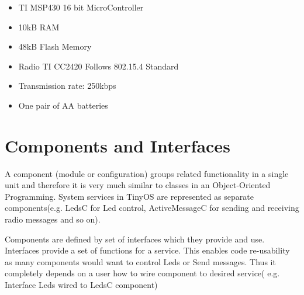 \begin{itemize}
	\item TI MSP430 16 bit MicroController
	\item 10kB RAM
	\item 48kB Flash Memory
	\item Radio TI CC2420 Follows 802.15.4 Standard
	\item Transmission rate: 250kbps
	\item One pair of AA batteries
\end{itemize}

\section{Components and Interfaces}

A component (module or configuration) groups related functionality in a single unit and therefore it is very much similar to classes in an Object-Oriented Programming. System services in TinyOS are represented as separate components(e.g. LedsC for Led control, ActiveMessageC for sending and receiving radio messages and so on).

Components are defined by set of interfaces which they provide and use. Interfaces provide a set of functions for a service. This enables code re-usability as many components would want to control Leds or Send messages. Thus it completely depends on a user how to wire component to desired service( e.g. Interface Leds wired to LedsC component) 


